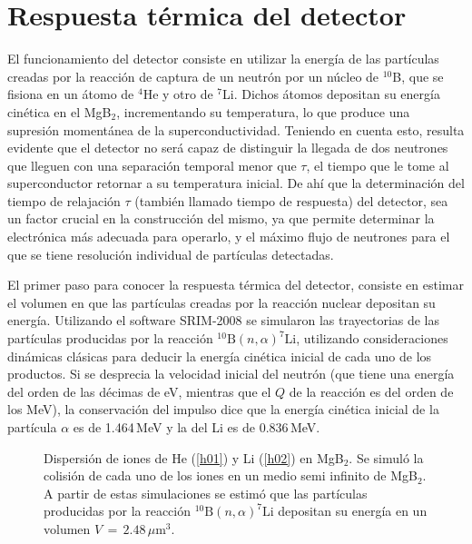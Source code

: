 \section{Respuesta térmica del detector}\label{S:term}
El funcionamiento del detector consiste en utilizar la energía de las partículas creadas por la reacción de captura de un neutrón por un núcleo de $^{10}$B, que se fisiona en un átomo de $^4$He y otro de $^7$Li. Dichos átomos depositan su energía cinética en el MgB$_2$, incrementando su temperatura, lo que produce una supresión momentánea de la superconductividad. Teniendo en cuenta esto, resulta evidente que el detector no será capaz de distinguir la llegada de dos neutrones que lleguen con una separación temporal menor que $\tau$, el tiempo que le tome al superconductor retornar a su tem\-pe\-ra\-tu\-ra inicial. De ahí que la determinación del tiempo de relajación $\tau$ (también lla\-ma\-do tiempo de respuesta) del detector, sea un factor crucial en la construcción del mismo, ya que permite determinar la electrónica más adecuada para operarlo, y el máximo flujo de neutrones para el que se tiene resolución individual de partículas detectadas.


El primer paso para conocer la respuesta térmica del detector, consiste en estimar el volumen en que las partículas creadas por la reacción nuclear depositan su energía. Utilizando el software SRIM-2008 se simularon las trayectorias de las partículas producidas por la reacción $^{10}\text{B}(n,\alpha)^{7}\text{Li}$, utilizando consideraciones dinámicas clásicas para deducir la energía cinética inicial de cada uno de los productos. Si se desprecia la velocidad inicial del neutrón (que tiene una energía del orden de las décimas de eV, mientras que el $Q$ de la reacción es del orden de los MeV), la conservación del impulso dice que la energía cinética inicial de la partícula $\alpha$ es de 1.464\,MeV y la del Li es de 0.836\,MeV. 
\begin{figure}[h!]
 \centering
 \hspace{0.1cm}
   \caption[Dispersión de iones de He (\ref{h01}) y Li (\ref{h02}) en MgB$_2$]{Dispersión de iones de He (\ref{h01}) y Li (\ref{h02}) en MgB$_2$. Se simuló la colisión de cada uno de los iones en un medio semi infinito de MgB$_2$. A partir de estas simulaciones se estimó que las partículas producidas por la reacción $^{10}\text{B}(n,\alpha)^{7}\text{Li}$ depositan su energía en un volumen $V \, = \, 2.48 \, \mu$m$^3$.}
\label{fig:HeLixy}
\end{figure}

